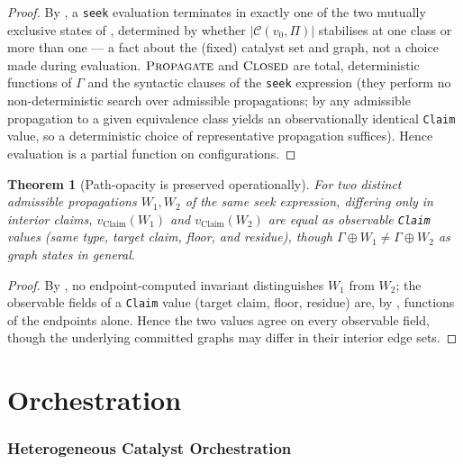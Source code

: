 \documentclass[11pt,twocolumn,a4paper]{article}
\theoremstyle{thmstyle}
\newtheorem{theorem}{Theorem}[section]
\theoremstyle{definition}
\theoremstyle{remark}
\newcommand{\Gph}{\Gamma}
\newcommand{\Walk}{W}
\newcommand{\Proc}{\Pi}
\newcommand{\Cell}{\mathcal{C}}
\newcommand{\abs}[1]{\lvert#1\rvert}
\begin{document}
\begin{proof}
By , a \texttt{seek} evaluation terminates in exactly one
of the two mutually exclusive states of , determined by whether $\abs{\Cell(v_0,\Proc)}$
stabilises at one class or more than one --- a fact about the (fixed)
catalyst set and graph, not a choice made during evaluation. $\textsc{Propagate}$
and $\textsc{Closed}$ are total, deterministic functions of $\Gph$ and the
syntactic clauses of the \texttt{seek} expression (they perform no
non-deterministic search over admissible propagations; by
 any admissible propagation to a given equivalence class
yields an observationally identical \texttt{Claim} value, so a
deterministic choice of representative propagation suffices). Hence
evaluation is a partial function on configurations.
\end{proof}

\begin{theorem}[Path-opacity is preserved operationally]
\label{thm:opacity-operational}
For two distinct admissible propagations $\Walk_1,\Walk_2$ of the same
seek expression, differing only in interior claims,
$v_{\mathrm{Claim}}(\Walk_1)$ and $v_{\mathrm{Claim}}(\Walk_2)$ are equal
as observable \texttt{Claim} values (same type, target claim, floor, and
residue), though $\Gph\oplus\Walk_1\neq\Gph\oplus\Walk_2$ as graph states
in general.
\end{theorem}

\begin{proof}
By , no endpoint-computed invariant distinguishes
$\Walk_1$ from $\Walk_2$; the observable fields of a \texttt{Claim} value
(target claim, floor, residue) are, by ,
functions of the endpoints alone. Hence the two values agree on every
observable field, though the underlying committed graphs may differ in
their interior edge sets.
\end{proof}

\part{Orchestration}

\section{Heterogeneous Catalyst Orchestration}
\label{sec:orchestration}
\end{document}

